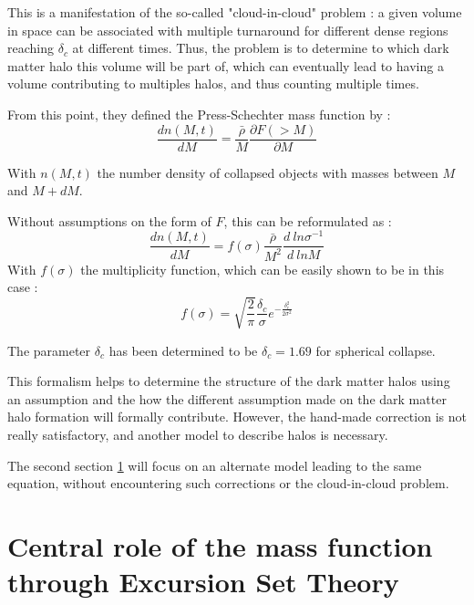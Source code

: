 This is a manifestation of the so-called "cloud-in-cloud" problem : a given volume in space can be associated with multiple turnaround for different dense regions reaching $\delta_c$ at different times. Thus, the problem is to determine to which dark matter halo this volume will be part of, which can eventually lead to having a volume contributing to multiples halos, and thus counting multiple times.


From this point, they defined the Press-Schechter mass function by :
\begin{equation}
\label{PS Mass Function}
\frac{dn(M,t)}{dM} = \frac{\bar{\rho}}{M} \frac{\partial F(>M)}{\partial M}
\end{equation}

With $n(M,t)$ the number density of collapsed objects with masses between $M$ and $M + dM$.

Without assumptions on the form of $F$, this can be reformulated as :
\begin{equation}
\label{Mass function equation}
\frac{dn(M,t)}{dM} = f(\sigma) \frac{\bar{\rho}}{M^2} \frac{d \ ln\sigma^{-1}}{d \ ln M}
\end{equation}
With $f(\sigma)$ the multiplicity function, which can be easily shown to be in this case :
\begin{equation}
\label{Multiplicity}
f(\sigma) = \sqrt{\frac{2}{\pi}} \frac{\delta_c}{\sigma} e^{-\frac{\delta_c^2}{2\sigma^2}}
\end{equation}

The parameter $\delta_c$ has been determined to be $\delta_c = 1.69$ for spherical collapse.

This formalism helps to determine the structure of the dark matter halos using an assumption and the how the different assumption made on the dark matter halo formation will formally contribute. However, the hand-made correction is not really satisfactory, and another model to describe halos is necessary.

The second section \ref{Section II} will focus on an alternate model leading to the same equation, without encountering such corrections or the cloud-in-cloud problem.





\section{Central role of the mass function through Excursion Set Theory}
\label{Section II}

